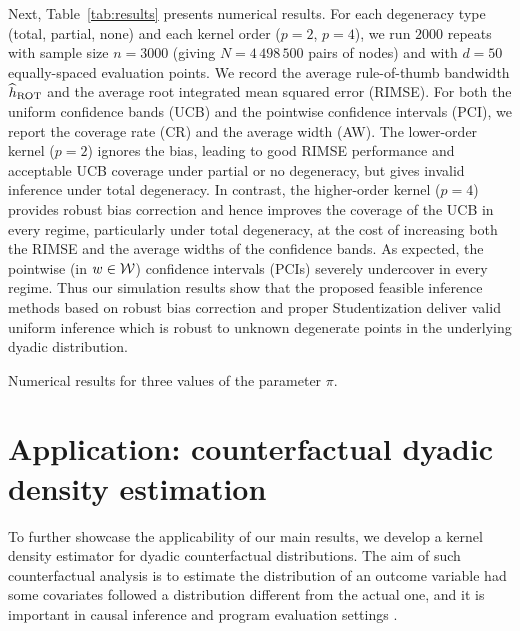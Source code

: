 Next, Table~\ref{tab:results} presents numerical results.
For each degeneracy type (total, partial, none)
and each kernel order ($p=2$, $p=4$),
we run $2000$ repeats
with sample size $n=3000$ (giving $N=4\,498\,500$ pairs of nodes)
and with $d=50$ equally-spaced evaluation points.
We record the average rule-of-thumb bandwidth $\widehat{h}_{\operatorname{ROT}}$
and the average root integrated mean squared error (RIMSE).
For both the uniform confidence bands (UCB)
and the pointwise confidence intervals (PCI),
we report the coverage rate (CR) and the average width (AW).
%
The lower-order kernel ($p=2$) ignores the bias, leading to
good RIMSE performance and acceptable UCB coverage
under partial or no degeneracy,
but gives invalid inference under total degeneracy.
In contrast, the higher-order kernel ($p=4$)
provides robust bias correction
and hence improves the coverage of the UCB in every regime,
particularly under total degeneracy,
at the cost of increasing both the RIMSE
and the average widths of the confidence bands.
%
As expected, the pointwise (in $w\in\mathcal{W}$) confidence intervals (PCIs)
severely undercover in every regime.
Thus our simulation results show that the proposed feasible
inference methods based on robust bias correction and proper Studentization
deliver valid uniform inference
which is robust to unknown degenerate points
in the underlying dyadic distribution.

\begin{table}[ht]
  \caption{Numerical results for three values of the parameter $\pi$.}
  \vspace{-1em}
  \label{tab:results}
\end{table}

\section{Application: counterfactual dyadic density estimation}
\label{sec:counterfactual}

To further showcase the applicability of our main results,
we develop a kernel density estimator for
dyadic counterfactual distributions.
The aim of such counterfactual analysis is to estimate the
distribution of an outcome variable had some covariates
followed a distribution different from the actual one,
and it is important in causal inference and program evaluation settings
\citep{dinardo1996distribution,chernozhukov2013inference}.

